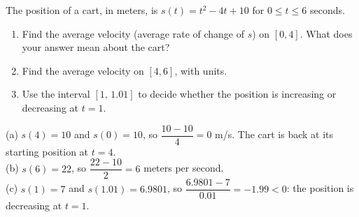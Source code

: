 \begin{exo}{}
The position of a cart, in meters, is $s(t)=t^2-4t+10$ for $0\le t\le6$ seconds.
\begin{enumerate}[label=(\alph*)]
\item Find the average velocity (average rate of change of $s$) on $[0,4]$. What does your answer mean about the cart?
\item Find the average velocity on $[4,6]$, with units.
\item Use the interval $[1,\,1.01]$ to decide whether the position is increasing or decreasing at $t=1$.
\end{enumerate}
\begin{solution}
(a) $s(4)=10$ and $s(0)=10$, so $\dfrac{10-10}{4}=0$ m/s. The cart is back at its starting position at $t=4$.\\
(b) $s(6)=22$, so $\dfrac{22-10}{2}=6$ meters per second.\\
(c) $s(1)=7$ and $s(1.01)=6.9801$, so $\dfrac{6.9801-7}{0.01}=-1.99<0$: the position is decreasing at $t=1$.
\end{solution}
\end{exo}


